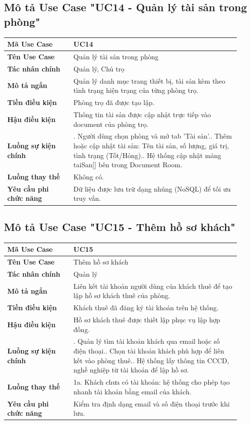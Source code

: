 \documentclass[a4paper,oneside]{report}
\begin{document}
\subsection{Mô tả Use Case "UC14 - Quản lý tài sản trong phòng"}

\begin{longtable}[]{@{}>{\RaggedRight\arraybackslash}p{0.27\linewidth}>{\RaggedRight\arraybackslash}p{0.68\linewidth}@{}}
\toprule
\textbf{Mã Use Case} & UC14\tabularnewline
\midrule
\endhead
\textbf{Tên Use Case} & Quản lý tài sản trong phòng\tabularnewline
\textbf{Tác nhân chính} & Quản lý, Chủ trọ\tabularnewline
\textbf{Mô tả ngắn} & Quản lý danh mục trang thiết bị, tài sản kèm theo
tình trạng hiện trạng của từng phòng trọ.\tabularnewline
\textbf{Tiền điều kiện} & Phòng trọ đã được tạo lập.\tabularnewline
\textbf{Hậu điều kiện} & Thông tin tài sản được cập nhật trực tiếp vào
document của phòng trọ.\tabularnewline
\textbf{Luồng sự kiện chính} & 1. Người dùng chọn
phòng và mở tab 'Tài sản'.\newline 2. Thêm hoặc cập nhật tài sản:
Tên tài sản, số lượng, giá trị, tình trạng (Tốt/Hỏng).\newline 3.
Hệ thống cập nhật mảng taiSan{[}{]} bên trong Document
Room.\tabularnewline
\textbf{Luồng thay thế} & Không có.\tabularnewline
\textbf{Yêu cầu phi chức năng} & Dữ liệu được lưu trữ dạng nhúng (NoSQL)
để tối ưu truy vấn.\tabularnewline
\bottomrule
\end{longtable}

\subsection{Mô tả Use Case "UC15 - Thêm hồ sơ khách"}

\begin{longtable}[]{@{}>{\RaggedRight\arraybackslash}p{0.27\linewidth}>{\RaggedRight\arraybackslash}p{0.68\linewidth}@{}}
\toprule
\textbf{Mã Use Case} & UC15\tabularnewline
\midrule
\endhead
\textbf{Tên Use Case} & Thêm hồ sơ khách\tabularnewline
\textbf{Tác nhân chính} & Quản lý\tabularnewline
\textbf{Mô tả ngắn} & Liên kết tài khoản người dùng của khách thuê để
tạo lập hồ sơ khách thuê của phòng.\tabularnewline
\textbf{Tiền điều kiện} & Khách thuê đã đăng ký tài khoản trên hệ
thống.\tabularnewline
\textbf{Hậu điều kiện} & Hồ sơ khách thuê được thiết lập phục vụ lập hợp
đồng.\tabularnewline
\textbf{Luồng sự kiện chính} & 1. Quản lý tìm tài
khoản khách qua email hoặc số điện thoại.\newline 2. Chọn tài khoản
khách phù hợp để liên kết vào phòng thuê.\newline 3. Hệ thống lấy
thông tin CCCD, nghề nghiệp từ tài khoản để lập hồ sơ.\tabularnewline
\textbf{Luồng thay thế} & 1a. Khách chưa có tài khoản: hệ thống cho phép
tạo nhanh tài khoản bằng email của khách.\tabularnewline
\textbf{Yêu cầu phi chức năng} & Kiểm tra định dạng email và số điện
thoại trước khi lưu.\tabularnewline
\bottomrule
\end{longtable}
\end{document}
